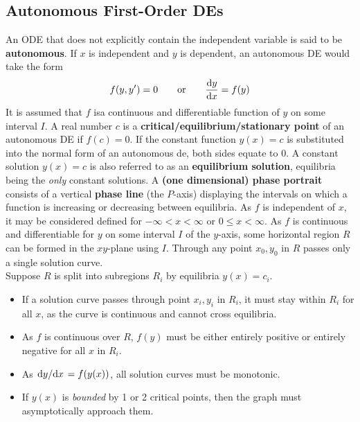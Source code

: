 \documentclass[./Differential Equations.tex]{subfiles}
\begin{document}
		\subsection{Autonomous First-Order DEs}
				An ODE that does not explicitly contain the independent variable is said to be \textbf{autonomous}. If \(x\) is independent and \(y\) is dependent, an autonomous DE would take the form
					\[f(y, y') = 0 \qquad \text{or} \qquad \dv{y}{x} = f(y)\]
					It is assumed that \(f\) isa  continuous and differentiable function of \(y\) on some interval \(I\).
				A real number \(c\) is a \textbf{critical/equilibrium/stationary point} of an autonomous DE if \(f(c) = 0\). If the constant function \(y(x) = c\) is substituted into the normal form of an autonomous de, both sides equate to 0.
				A constant solution \(y(x) = c\) is also referred to as an \textbf{equilibrium solution}, equilibria being the \textit{only} constant solutions.
				A \textbf{(one dimensional) phase portrait} consists of a vertical \textbf{phase line} (the \(P\)-axis) displaying the intervals on which a function is increasing or decreasing between equilibria.
				As \(f\) is independent of \(x\), it may be considered defined for \(-\infty < x < \infty\) or \(0 \le x < \infty\). As \(f\) is continuous and differentiable for \(y\) on some interval \(I\) of the \(y\)-axis, some horizontal region \(R\) can be formed in the \(xy\)-plane using \(I\). Through any point \(x_0, y_0\) in \(R\) passes only a single solution curve. \\
				Suppose \(R\) is split into subregions \(R_i\) by equilibria \(y(x) = c_i\). 
				\begin{itemize}
					\item
						If a solution curve passes through point \(x_i, y_i\) in \(R_i\), it must stay within \(R_i\) for all \(x\), as the curve is continuous and cannot cross equilibria.
					\item
						As \(f\) is continuous over \(R\), \(f(y)\) must be either entirely positive or entirely negative for all \(x\) in \(R_i\).
					\item
						As \(\dv*{y}{x} = f(y(x))\), all solution curves must be monotonic.
					\item
						If \(y(x)\) is \textit{bounded} by 1 or 2 critical points, then the graph must asymptotically approach them.
				\end{itemize}
\end{document}
